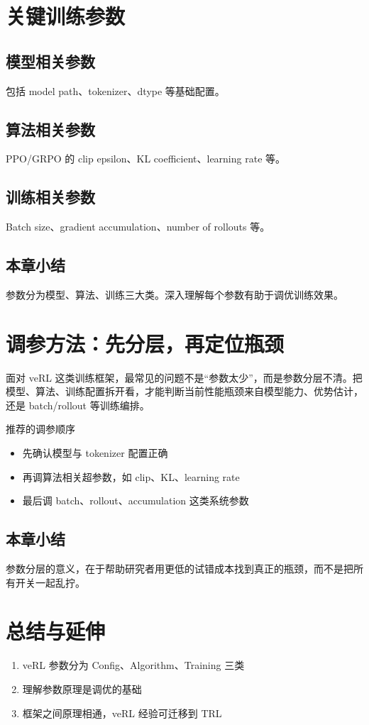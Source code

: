 \documentclass[a4paper]{article}
\begin{document}
\section{关键训练参数}
\subsection{模型相关参数}
包括 model path、tokenizer、dtype 等基础配置。

\subsection{算法相关参数}
PPO/GRPO 的 clip epsilon、KL coefficient、learning rate 等。

\subsection{训练相关参数}
Batch size、gradient accumulation、number of rollouts 等。

\subsection{本章小结}
参数分为模型、算法、训练三大类。深入理解每个参数有助于调优训练效果。

\newpage
\section{调参方法：先分层，再定位瓶颈}
面对 veRL 这类训练框架，最常见的问题不是“参数太少”，而是参数分层不清。把模型、算法、训练配置拆开看，才能判断当前性能瓶颈来自模型能力、优势估计，还是 batch/rollout 等训练编排。

\begin{knowledgebox}{推荐的调参顺序}
\begin{itemize}
  \item 先确认模型与 tokenizer 配置正确
  \item 再调算法相关超参数，如 clip、KL、learning rate
  \item 最后调 batch、rollout、accumulation 这类系统参数
\end{itemize}
\end{knowledgebox}

\subsection{本章小结}
参数分层的意义，在于帮助研究者用更低的试错成本找到真正的瓶颈，而不是把所有开关一起乱拧。

\newpage
\section{总结与延伸}
\begin{enumerate}
  \item veRL 参数分为 Config、Algorithm、Training 三类
  \item 理解参数原理是调优的基础
  \item 框架之间原理相通，veRL 经验可迁移到 TRL
\end{enumerate}
\end{document}
